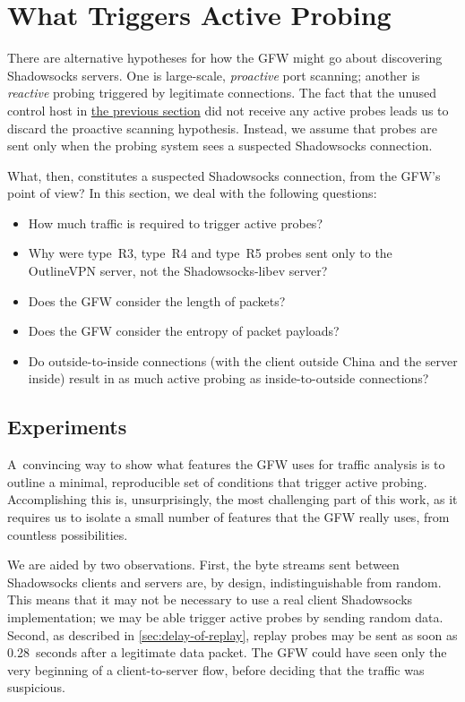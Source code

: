 \documentclass[sigconf,letterpaper]{acmart}
\begin{document}
\section{What Triggers Active Probing}
\label{sec:conditions}

There are alternative hypotheses for how the GFW might go about discovering Shadowsocks servers.
One is large-scale, \emph{proactive} port scanning;
another is \emph{reactive} probing triggered by legitimate connections.
The fact that the unused control host in \hyperref[sec:characterization]{the previous section}
did not receive any active probes leads us to discard the proactive scanning hypothesis.
Instead, we assume that probes are sent only when the probing system
sees a suspected Shadowsocks connection.

What, then, constitutes a suspected Shadowsocks connection, from the GFW's point of view?
In this section, we deal with the following questions:

\begin{itemize}
    \item How much traffic is required to trigger active probes?
    \item Why were type~R3, type~R4 and type~R5 probes sent only to the OutlineVPN server, not the Shadowsocks-libev server?
    \item Does the GFW consider the length of packets?
    \item Does the GFW consider the entropy of packet payloads?
    \item Do outside-to-inside connections (with the client outside China and the server inside) result in as much active probing as inside-to-outside connections?
\end{itemize}

\subsection{Experiments}
\label{sec:conditions-experiments}

A~convincing way to show what features the GFW uses for traffic analysis is to outline a minimal,
reproducible set of conditions that trigger active probing.
Accomplishing this is, unsurprisingly, the most challenging part of this work,
as it requires us to isolate a small number of features that the GFW really uses,
from countless possibilities.

We are aided by two observations.
First, the byte streams sent between Shadowsocks clients and servers are,
by design, indistinguishable from random.
This means that it may not be necessary to use a real client Shadowsocks implementation;
we may be able trigger active probes by sending random data.
Second, as described in \autoref{sec:delay-of-replay},
replay probes may be sent as soon as 0.28~seconds after a legitimate data packet.
The GFW could have seen only the very beginning
of a client-to-server flow,
before deciding that the traffic was suspicious.
\end{document}
